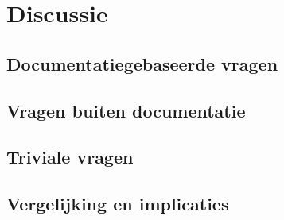 
\chapter{Discussie}
\label{ch:discussie}

\section{Documentatiegebaseerde vragen}


\section{Vragen buiten documentatie}

\section{Triviale vragen}

\section{Vergelijking en implicaties}
